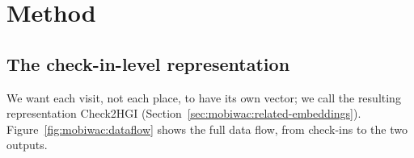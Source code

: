 \section{Method}
\label{sec:mobiwac:method}

\subsection{The check-in-level representation}
\label{sec:mobiwac:method-rep}

We want each visit, not each place, to have its own vector; we call the resulting representation Check2HGI (Section~\ref{sec:mobiwac:related-embeddings}).
Figure~\ref{fig:mobiwac:dataflow} shows the full data flow, from check-ins to the two outputs.

